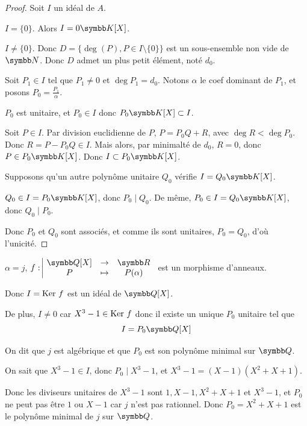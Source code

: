 \begin{proof}
    Soit $I$ un idéal de $A$. 

     $I = \{0\}$. Alors $I = 0 \K[X]$.

     $I \neq \{0\}$. Donc $D = \{\deg(P), P \in I \setminus \{0\}\}$ 
    est un sous-ensemble non vide de $\N$. Donc $D$ admet un plus petit élément, noté $d_0$.

    Soit $P_1 \in I$ tel que $P_1 \neq 0 $ et $\deg P_1 = d_0$. Notons $\alpha$ le coef dominant 
    de $P_1$, et posons $P_0 = \frac{P_1} \alpha$. 

    $P_0$ est unitaire, et $P_0 \in I$ donc $P_0 \K[X] \subset I$.

    \avspace Soit $P \in I$. Par division euclidienne de $P$, $P = P_0 Q + R$, avec 
    $\deg R < \deg P_0$. Donc $R = P - P_0 Q \in I$. Mais alors, par minimalté de $d_0$,
    $R = 0$, donc $P \in P_0 \K[X]$. Donc $I \subset P_0 \K[X]$.

    \lvspace Supposons qu'un autre polynôme unitaire $Q_0$ vérifie $I = Q_0 \K[X]$.

    $Q_0 \in I = P_0 \K[X]$, donc $P_0 \mid Q_0$. De même, $P_0 \in I = Q_0 \K[X]$, donc $Q_0 \mid P_0$.

    Donc $P_0$ et $Q_0$ sont associés, et comme ils sont unitaires, $P_0 = Q_0$, d'où l'unicité.
\end{proof}

\begin{exemple}
    $\alpha = j$, $\fonction f {\Q[X]}\R P {P(\alpha)}$ est un morphisme d'anneaux.

    Donc $I = \operatorname{Ker} \, f$ est un idéal de $\Q[X]$.

    De plus, $I \neq 0$ car $X^3 - 1 \in \operatorname{Ker} \, f$ donc il existe un unique $P_0$ unitaire
    tel que \[I = P_0 \Q[X]\]

    On dit que $j$ est algébrique et que $P_0$ est son polynôme minimal sur $\Q$.

    On sait que $X^3 - 1 \in I$, donc $P_0 \mid X^3 - 1$, et 
    $X^3 - 1 = (X - 1)(X^2 + X + 1)$. 

    Donc les diviseurs unitaires de $X^3 - 1$ sont $1, X - 1, X^2 + X + 1$ et $X^3 - 1$, et 
    $P_0$ ne peut pas être $1$ ou $X - 1$ car $j$ n'est pas rationnel. 
    Donc $P_0 = X^2 + X + 1$ est le polynôme minimal de $j$ sur $\Q$.
\end{exemple}

